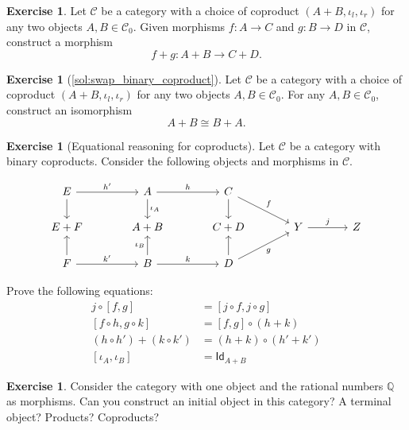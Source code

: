 \documentclass[a4paper,11pt, oneside,titlepage=false]{scrbook}
\theoremstyle{plain}
\theoremstyle{definition}
\newtheorem{exer}[thm]{Exercise}
\newcommand{\cfont}[1]{\ensuremath{\mathsf{#1}}}
\newcommand{\Cat}[1]{\mathcal{#1}}
\newcommand{\CC}{\Cat{C}}
\newcommand{\Ob}[1]{{#1}_0}
\newcommand{\Id}[1][]{\cfont{Id}_{#1}}
\newcommand{\inl}{\ensuremath{\iota_l}}
\newcommand{\inr}{\ensuremath{\iota_r}}
\newcommand{\outofcoproduct}[2]{\ensuremath{[ #1, #2 ]}}
\newcommand{\coproductmap}[2]{\ensuremath{ #1 + #2 }}
\newcommand{\co}[2]{\ensuremath{#2 \circ #1}}
\begin{document}
\begin{exer}\label{exer:coproduct_of_morphisms}
  Let $\CC$ be a category with a choice of coproduct $(A + B, \inl, \inr)$ for any two objects $A,B\in \Ob{\CC}$.
  Given morphisms $f : A \to C$ and $g : B \to D$ in $\CC$, construct a morphism
  \[ f + g : A + B \to C + D.\]
\end{exer}

\begin{exer}[\cref{sol:swap_binary_coproduct}]\label{exer:swap_binary_coproduct}
  Let $\CC$ be a category with a choice of coproduct $(A+ B, \inl, \inr)$ for any two objects $A,B\in \Ob{\CC}$.
  For any $A, B \in \Ob\CC$, construct an isomorphism
  \[ A + B \cong B + A. \]
\end{exer}


\begin{exer}[Equational reasoning for coproducts]
  Let $\CC$ be a category with binary coproducts.
  Consider the following objects and morphisms in $\CC$.

  \[
    \begin{tikzcd}[column sep=large]
      E \ar[r, "h'"] \ar[d]
      &
      A \ar[r, "h"] \ar[d, "\iota_A"]
      &
      C  \ar[d] \ar[rd, "f"]
      \\
      E + F
      &
      A+ B
      &
      C + D 
      &
      Y \ar[r, "j"]
      &
      Z
      \\
      F \ar[r, "k'"] \ar[u]
      &
      B \ar[u, "\iota_B"] \ar[r,"k"]
      &
      D \ar[u] \ar[ru, "g"']
    \end{tikzcd}
  \]
  
  Prove the following equations:
  \begin{align}
    \co{\outofcoproduct{f}{g}}{j} &= \outofcoproduct{\co f j}{\co g j}
    \\
    \outofcoproduct{\co h f}{\co k g} &= \co {(\coproductmap h k)} {\outofcoproduct f g}
    \\
    \coproductmap{(\co {h'} h)}{(\co {k'} k)} &= \co {(\coproductmap {h'} {k'}) }{(\coproductmap h k)}
    \\
    \outofcoproduct{\iota_A}{\iota_B} &= \Id[A + B]
  \end{align}
\end{exer}


\begin{exer}
  Consider the category with one object and the rational numbers $\mathbb{Q}$ as morphisms.
  Can you construct an initial object in this category? A terminal object? Products? Coproducts?
\end{exer}
\end{document}
